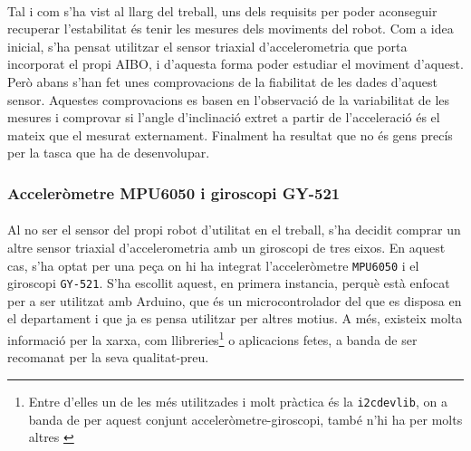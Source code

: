 \documentclass[12pt,a4paper,final,twoside]{article}
\begin{document}


\paragraph{}Tal i com s'ha vist al llarg del treball, uns dels requisits per poder aconseguir recuperar l'estabilitat és tenir les mesures dels moviments del robot. Com a idea inicial, s'ha pensat utilitzar el sensor triaxial d'accelerometria que porta incorporat el propi AIBO, i d'aquesta forma poder estudiar el moviment d'aquest. Però abans s'han fet unes comprovacions de la fiabilitat de les dades d'aquest sensor. Aquestes comprovacions es basen en l'observació de la variabilitat de les mesures i comprovar si l'angle d'inclinació extret a partir de l'acceleració és el mateix que el mesurat externament. Finalment ha resultat que no és gens precís per la tasca que ha de desenvolupar.

\subsubsection{Acceleròmetre MPU6050 i giroscopi GY-521}

\paragraph{}Al no ser el sensor del propi robot d'utilitat en el treball, s'ha decidit comprar un altre sensor triaxial d'accelerometria amb un giroscopi de tres eixos. En aquest cas, s'ha optat per una peça on hi ha integrat l'acceleròmetre \texttt{MPU6050} i el giroscopi \texttt{GY-521}. S'ha escollit aquest, en primera instancia, perquè està enfocat per a ser utilitzat amb Arduino, que és un microcontrolador del que es disposa en el departament i que ja es pensa utilitzar per altres motius. A més, existeix molta informació per la xarxa, com llibreries\footnote{Entre d'elles un de les més utilitzades i molt pràctica és la \texttt{i2cdevlib}, on a banda de per aquest conjunt acceleròmetre-giroscopi, també n'hi ha per molts altres \cite{Rowberg}} o aplicacions fetes, a banda de ser recomanat per la seva qualitat-preu.
\end{document}
